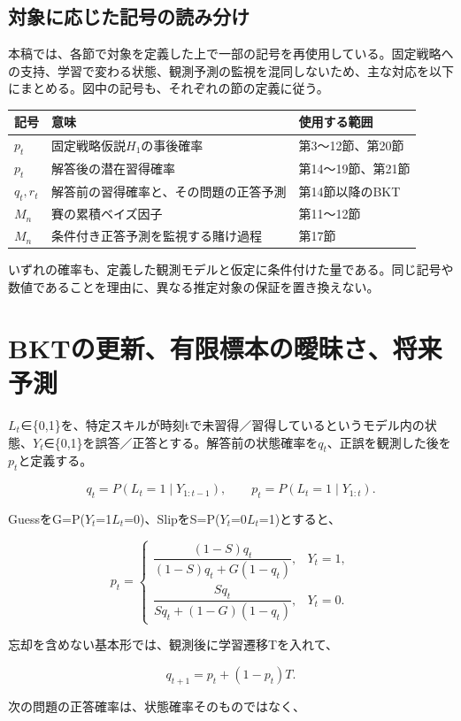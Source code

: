 \documentclass[11pt,a4paper]{article}
\numberwithin{equation}{section}
\begin{document}
\subsection*{対象に応じた記号の読み分け}
本稿では、各節で対象を定義した上で一部の記号を再使用している。固定戦略への支持、学習で変わる状態、観測予測の監視を混同しないため、主な対応を以下にまとめる。図中の記号も、それぞれの節の定義に従う。
\begin{center}\small
\begin{tabular}{@{}p{18mm}p{88mm}p{39mm}@{}}
\toprule
記号 & 意味 & 使用する範囲\\
\midrule
$p_t$ & 固定戦略仮説$H_1$の事後確率 & 第3〜12節、第20節\\
$p_t$ & 解答後の潜在習得確率 & 第14〜19節、第21節\\
$q_t,r_t$ & 解答前の習得確率と、その問題の正答予測 & 第14節以降のBKT\\
$M_n$ & 賽の累積ベイズ因子 & 第11〜12節\\
$M_n$ & 条件付き正答予測を監視する賭け過程 & 第17節\\
\bottomrule
\end{tabular}\end{center}
いずれの確率も、定義した観測モデルと仮定に条件付けた量である。同じ記号や数値であることを理由に、異なる推定対象の保証を置き換えない。

\section{BKTの更新、有限標本の曖昧さ、将来予測}\label{sec:bkt}

$L_t$∈\{0,1\}を、特定スキルが時刻tで未習得／習得しているというモデル内の状態、$Y_t$∈\{0,1\}を誤答／正答とする。解答前の状態確率を$q_t$、正誤を観測した後を$p_t$と定義する。

\[
q_t=P(L_t=1\mid Y_{1:t-1}),\qquad p_t=P(L_t=1\mid Y_{1:t}).
\]

GuessをG=P($Y_t$=1\textbar $L_t$=0)、SlipをS=P($Y_t$=0\textbar $L_t$=1)とすると、

\[
p_t=
\begin{cases}
\dfrac{(1-S)q_t}{(1-S)q_t+G(1-q_t)},&Y_t=1,\\[6pt]
\dfrac{Sq_t}{Sq_t+(1-G)(1-q_t)},&Y_t=0.
\end{cases}
\]

忘却を含めない基本形では、観測後に学習遷移Tを入れて、

\[
q_{t+1}=p_t+(1-p_t)T.
\]

次の問題の正答確率は、状態確率そのものではなく、
\end{document}
